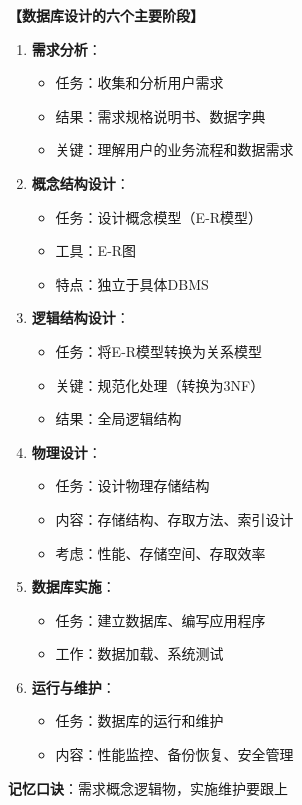 \documentclass[12pt, a4paper]{article}
\newenvironment{bluebox}[1]{%
  \begin{trivlist}
  \item[\hskip\labelsep \textbf{#1}]
  \setlength{\parskip}{0.5ex}
  \setlength{\itemsep}{0.5ex}
}{%
  \end{trivlist}
  }
\begin{document}
\begin{bluebox}{六个主要阶段}
	\textbf{【数据库设计的六个主要阶段】}

	\begin{enumerate}[leftmargin=*, label=\textbf{\arabic*.}]
		\item \textbf{需求分析}：
		      \begin{itemize}[nosep]
			      \item 任务：收集和分析用户需求
			      \item 结果：需求规格说明书、数据字典
			      \item 关键：理解用户的业务流程和数据需求
		      \end{itemize}

		\item \textbf{概念结构设计}：
		      \begin{itemize}[nosep]
			      \item 任务：设计概念模型（E-R模型）
			      \item 工具：E-R图
			      \item 特点：独立于具体DBMS
		      \end{itemize}

		\item \textbf{逻辑结构设计}：
		      \begin{itemize}[nosep]
			      \item 任务：将E-R模型转换为关系模型
			      \item 关键：规范化处理（转换为3NF）
			      \item 结果：全局逻辑结构
		      \end{itemize}

		\item \textbf{物理设计}：
		      \begin{itemize}[nosep]
			      \item 任务：设计物理存储结构
			      \item 内容：存储结构、存取方法、索引设计
			      \item 考虑：性能、存储空间、存取效率
		      \end{itemize}

		\item \textbf{数据库实施}：
		      \begin{itemize}[nosep]
			      \item 任务：建立数据库、编写应用程序
			      \item 工作：数据加载、系统测试
		      \end{itemize}

		\item \textbf{运行与维护}：
		      \begin{itemize}[nosep]
			      \item 任务：数据库的运行和维护
			      \item 内容：性能监控、备份恢复、安全管理
		      \end{itemize}
	\end{enumerate}

	\textbf{记忆口诀}：需求概念逻辑物，实施维护要跟上
\end{bluebox}
\end{document}
